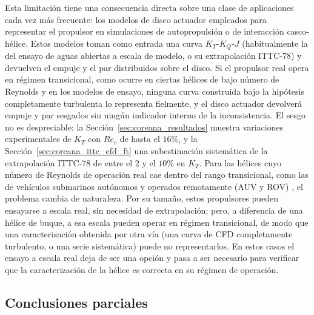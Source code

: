 Esta limitación tiene una consecuencia directa sobre una clase de aplicaciones cada vez más
frecuente: los modelos de disco actuador empleados para representar el propulsor en
simulaciones de autopropulsión o de interacción casco-hélice. Estos modelos toman como
entrada una curva $K_T$-$K_Q$-$J$ (habitualmente la del ensayo de aguas abiertas a escala
de modelo, o su extrapolación ITTC-78) y devuelven el empuje y el par distribuidos sobre el
disco. Si el propulsor real opera en régimen transicional, como ocurre en ciertas hélices de
bajo número de Reynolds y en los modelos de ensayo, ninguna curva construida bajo la hipótesis completamente
turbulenta lo representa fielmente, y el disco actuador devolverá empuje y par sesgados sin
ningún indicador interno de la inconsistencia. El sesgo no es despreciable: la
Sección~\ref{sec:coreana_resultados} muestra variaciones experimentales de $K_T$ con $Re_c$ de hasta el $16\%$, y la Sección~\ref{sec:coreana_ittc_efd_ft} una subestimación sistemática de la extrapolación
ITTC-78 de entre el $2$ y el $10\%$ en $K_T$. Para las hélices cuyo número de Reynolds de operación real cae dentro del rango
transicional, como las de vehículos submarinos autónomos y operados remotamente (AUV y ROV)
\citep{pawar2019relevance}, el problema cambia de naturaleza. Por su tamaño, estos
propulsores pueden ensayarse a escala real, sin necesidad de extrapolación; pero, a
diferencia de una hélice de buque, a esa escala pueden operar en régimen transicional, de
modo que una caracterización obtenida por otra vía (una curva de CFD completamente
turbulento, o una serie sistemática) puede no representarlos. En estos casos el ensayo a
escala real deja de ser una opción y pasa a ser necesario para verificar que la
caracterización de la hélice es correcta en su régimen de operación.

\subsection{Conclusiones parciales}

